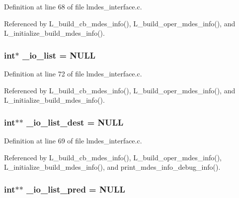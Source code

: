 Definition at line 68 of file lmdes\_\-interface.c.

Referenced by L\_\-build\_\-cb\_\-mdes\_\-info(), L\_\-build\_\-oper\_\-mdes\_\-info(), and L\_\-initialize\_\-build\_\-mdes\_\-info().
\subsubsection{\setlength{\rightskip}{0pt plus 5cm}int$\ast$ \bf{\_\-io\_\-list} = \bf{NULL}\hspace{0.3cm}{\tt  [static]}}\label{lmdes__interface_8c_1796fb71ba72007ffbb7fd467e95c706}




Definition at line 72 of file lmdes\_\-interface.c.

Referenced by L\_\-build\_\-cb\_\-mdes\_\-info(), L\_\-build\_\-oper\_\-mdes\_\-info(), and L\_\-initialize\_\-build\_\-mdes\_\-info().
\subsubsection{\setlength{\rightskip}{0pt plus 5cm}int$\ast$$\ast$ \bf{\_\-io\_\-list\_\-dest} = \bf{NULL}\hspace{0.3cm}{\tt  [static]}}\label{lmdes__interface_8c_1d6043f456863a888025840b1f1fa2f5}




Definition at line 69 of file lmdes\_\-interface.c.

Referenced by L\_\-build\_\-cb\_\-mdes\_\-info(), L\_\-build\_\-oper\_\-mdes\_\-info(), L\_\-initialize\_\-build\_\-mdes\_\-info(), and print\_\-mdes\_\-info\_\-debug\_\-info().
\subsubsection{\setlength{\rightskip}{0pt plus 5cm}int$\ast$$\ast$ \bf{\_\-io\_\-list\_\-pred} = \bf{NULL}\hspace{0.3cm}{\tt  [static]}}\label{lmdes__interface_8c_d02863cc9dee027e49dc7b55480fa826}




